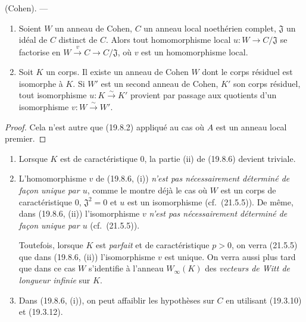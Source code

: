 \begin{theorem}[19.8.6]
\label{0.19.8.6-fr}
\textup{(Cohen).} ---
\begin{enumerate}
  \item[(i)] Soient $W$ un anneau de Cohen, $C$ un anneau local noethérien
  complet, $\mathfrak J$ un idéal de $C$ distinct de $C$. Alors tout
  homomorphisme local $u:W\to C/\mathfrak J$ se factorise en
  $W\xrightarrow{v}C\to C/\mathfrak J$, où $v$ est un homomorphisme local.
  \item[(ii)] Soit $K$ un corps. Il existe un anneau de Cohen $W$ dont le corps
  résiduel est isomorphe à $K$. Si $W'$ est un second anneau de Cohen, $K'$ son
  corps résiduel, tout isomorphisme $u:K\xrightarrow{\sim}K'$ provient par
  passage aux quotients d'un isomorphisme $v:W\xrightarrow{\sim}W'$.
\end{enumerate}
\end{theorem}

\begin{proof}
Cela n'est autre que (19.8.2) appliqué au cas où $A$ est un anneau local
premier.
\end{proof}

\begin{remarks}[19.8.7]
\label{0.19.8.7-fr}
\begin{enumerate}
  \item[(i)] Lorsque $K$ est de caractéristique $0$, la partie (ii) de (19.8.6)
  devient triviale.
  \item[(ii)] L'homomorphisme $v$ de (19.8.6, (i)) \emph{n'est pas
  nécessairement déterminé de façon unique par $u$}, comme le montre déjà le
  cas où $W$ est un corps de caractéristique $0$, $\mathfrak J^2=0$ et $u$ est
  un isomorphisme (cf.~(21.5.5)). De même, dans (19.8.6, (ii)) l'isomorphisme
  $v$ \emph{n'est pas nécessairement déterminé de façon unique par $u$}
  (cf.~(21.5.5)).

  Toutefois, lorsque $K$ est \emph{parfait} et de caractéristique $p>0$, on
  verra (21.5.5) que dans (19.8.6, (ii)) l'isomorphisme $v$ est unique. On verra
  aussi plus tard que dans ce cas $W$ s'identifie à l'anneau $W_\infty(K)$ des
  \emph{vecteurs de Witt de longueur infinie} sur $K$.
  \item[(iii)] Dans (19.8.6, (i)), on peut affaiblir les hypothèses sur $C$ en
  utilisant (19.3.10) et (19.3.12).
\end{enumerate}
\end{remarks}

